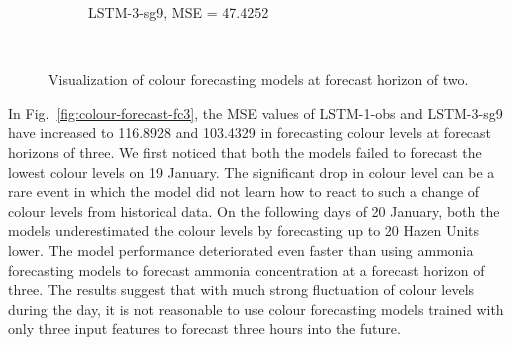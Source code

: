 \begin{figure}[!ht]
\begin{subfigure}[t]{0.7\textwidth}
    \caption{LSTM-3-sg9, MSE = 47.4252} \label{fig:colour-lstm-3-fc2}
  \end{subfigure}\\
\caption{Visualization of colour forecasting models at forecast horizon of two.} \label{fig:colour-forecast-fc2}
\end{figure}

In Fig.~\ref{fig:colour-forecast-fc3}, the MSE values of LSTM-1-obs and LSTM-3-sg9 have increased to 116.8928 and 103.4329 in forecasting colour levels at forecast horizons of three. We first noticed that both the models failed to forecast the lowest colour levels on 19 January. The significant drop in colour level can be a rare event in which the model did not learn how to react to such a change of colour levels from historical data. On the following days of 20 January, both the models underestimated the colour levels by forecasting up to 20 Hazen Units lower. The model performance deteriorated even faster than using ammonia forecasting models to forecast ammonia concentration at a forecast horizon of three. The results suggest that with much strong fluctuation of colour levels during the day, it is not reasonable to use colour forecasting models trained with only three input features to forecast three hours into the future.

